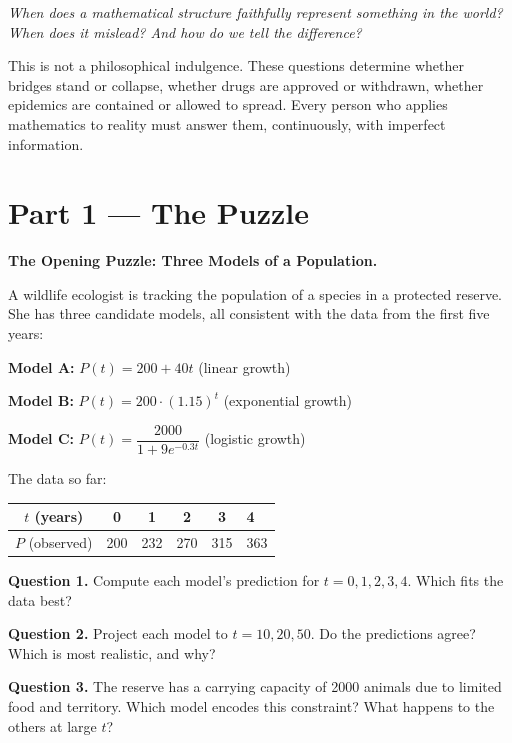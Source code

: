 \documentclass[12pt, a4paper]{article}
\begin{document}
\medskip
\begin{center}
\itshape
When does a mathematical structure faithfully represent something in the world?\\
When does it mislead? And how do we tell the difference?
\end{center}

\medskip
This is not a philosophical indulgence. These questions determine whether bridges stand or collapse, whether drugs are approved or withdrawn, whether epidemics are contained or allowed to spread. Every person who applies mathematics to reality must answer them, continuously, with imperfect information.

\newpage

\section{Part 1 \texorpdfstring{---}{--} The Puzzle}

\begin{puzzlebox}
\textbf{The Opening Puzzle: Three Models of a Population.}

A wildlife ecologist is tracking the population of a species in a protected reserve. She has three candidate models, all consistent with the data from the first five years:

\medskip
\textbf{Model A:} $P(t) = 200 + 40t$ \hfill (linear growth)

\textbf{Model B:} $P(t) = 200 \cdot (1.15)^t$ \hfill (exponential growth)

\textbf{Model C:} $P(t) = \dfrac{2000}{1 + 9e^{-0.3t}}$ \hfill (logistic growth)

\medskip
The data so far:

\begin{center}
\begin{tabular}{ccccc}
\toprule
$t$ (years) & 0 & 1 & 2 & 3 & 4 \\
\midrule
$P$ (observed) & 200 & 232 & 270 & 315 & 363 \\
\bottomrule
\end{tabular}
\end{center}

\medskip
\textbf{Question 1.} Compute each model's prediction for $t = 0, 1, 2, 3, 4$. Which fits the data best?

\textbf{Question 2.} Project each model to $t = 10, 20, 50$. Do the predictions agree? Which is most realistic, and why?

\textbf{Question 3.} The reserve has a carrying capacity of 2000 animals due to limited food and territory. Which model encodes this constraint? What happens to the others at large $t$?
\end{puzzlebox}
\end{document}
